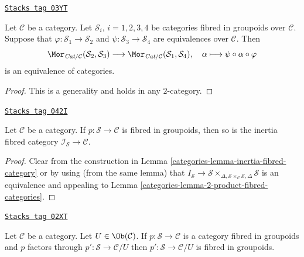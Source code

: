 \begin{lemma}
\label{categories-lemma-morphisms-equivalent-fibred-groupoids}
\href{https://stacks.math.columbia.edu/tag/03YT}{\texttt{Stacks tag 03YT}}

Let $\mathcal{C}$ be a category.
Let $\mathcal{S}_i$, $i = 1, 2, 3, 4$ be categories fibred in
groupoids over $\mathcal{C}$.
Suppose that $\varphi : \mathcal{S}_1 \to \mathcal{S}_2$ and
$\psi : \mathcal{S}_3 \to \mathcal{S}_4$ are equivalences
over $\mathcal{C}$. Then
$$
\Mor_{\textit{Cat}/\mathcal{C}}(\mathcal{S}_2, \mathcal{S}_3)
\longrightarrow
\Mor_{\textit{Cat}/\mathcal{C}}(\mathcal{S}_1, \mathcal{S}_4),
\quad \alpha \longmapsto \psi \circ \alpha \circ \varphi
$$
is an equivalence of categories.
\end{lemma}

\begin{proof}
This is a generality and holds in any $2$-category.
\end{proof}

\begin{lemma}
\label{categories-lemma-inertia-fibred-groupoids}
\href{https://stacks.math.columbia.edu/tag/042I}{\texttt{Stacks tag 042I}}

Let $\mathcal{C}$ be a category.
If $p : \mathcal{S} \to \mathcal{C}$ is fibred in groupoids, then
so is the inertia fibred category $\mathcal{I}_\mathcal{S} \to \mathcal{C}$.
\end{lemma}

\begin{proof}

Clear from the construction in
Lemma \ref{categories-lemma-inertia-fibred-category}
or by using (from the same lemma) that
$I_\mathcal{S} \to \mathcal{S}
\times_{\Delta, \mathcal{S} \times_\mathcal{C} \mathcal{S}, \Delta}\mathcal{S}$
is an equivalence and appealing to
Lemma \ref{categories-lemma-2-product-fibred-categories}.
\end{proof}

\begin{lemma}
\label{categories-lemma-cute-groupoids}
\href{https://stacks.math.columbia.edu/tag/02XT}{\texttt{Stacks tag 02XT}}

Let $\mathcal{C}$ be a category. Let $U \in \Ob(\mathcal{C})$.
If $p : \mathcal{S} \to \mathcal{C}$ is a category fibred in groupoids
and $p$ factors through $p' : \mathcal{S} \to \mathcal{C}/U$
then $p' : \mathcal{S} \to \mathcal{C}/U$ is fibred in groupoids.
\end{lemma}

